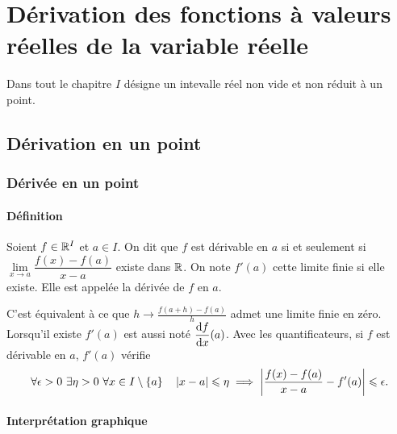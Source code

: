 \chapter[Dérivation des fonctions de la variable réelle]{Dérivation des fonctions à valeurs réelles de la variable réelle} 
\minitoc
\minilof
\minilot
Dans tout le chapitre $I$ désigne un intevalle réel non vide et non réduit à un point.
\section{Dérivation en un point}
\subsection{Dérivée en un point}
\subsubsection{Définition}
\begin{defdef}
  Soient $f \in \mathbb{R}^I$ et $a \in I$. On dit que $f$ est dérivable en $a$ si et seulement si $\lim\limits_{x \to a} \dfrac{f(x)-f(a)}{x-a}$ existe dans $\mathbb{R}$. On note $f'(a)$ cette limite finie si elle existe. Elle est appelée la dérivée de $f$ en $a$.
\end{defdef}
C'est équivalent à ce que $h \longrightarrow \frac{f(a+h)-f(a)}{h}$ admet une limite finie en zéro. Lorsqu'il existe $f'(a)$ est aussi noté $\dfrac{\mathrm{d} f}{\mathrm{d} x}(a)$. Avec les quantificateurs, si $f$ est dérivable en $a$, $f'(a)$ vérifie
\begin{equation}
  \forall \epsilon >0 \ \exists \eta > 0 \ \forall x \in I\setminus\{a\} \quad \left\lvert x-a\right\rvert \leqslant \eta \implies \left\lvert\frac{f(x)-f(a)}{x-a} - f'(a)\right\rvert \leqslant \epsilon.
\end{equation}

\subsubsection{Interprétation graphique}

